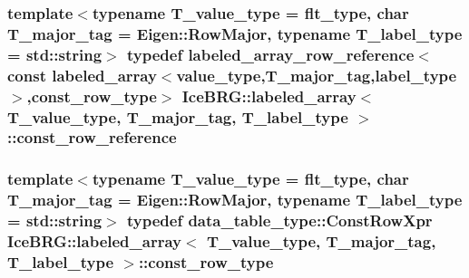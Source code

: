 \subsubsection[{const\+\_\+row\+\_\+reference}]{\setlength{\rightskip}{0pt plus 5cm}template$<$typename T\+\_\+value\+\_\+type = flt\+\_\+type, char T\+\_\+major\+\_\+tag = Eigen\+::\+Row\+Major, typename T\+\_\+label\+\_\+type = std\+::string$>$ typedef {\bf labeled\+\_\+array\+\_\+row\+\_\+reference}$<$const {\bf labeled\+\_\+array}$<${\bf value\+\_\+type},T\+\_\+major\+\_\+tag,{\bf label\+\_\+type}$>$,{\bf const\+\_\+row\+\_\+type}$>$ {\bf Ice\+B\+R\+G\+::labeled\+\_\+array}$<$ T\+\_\+value\+\_\+type, T\+\_\+major\+\_\+tag, T\+\_\+label\+\_\+type $>$\+::{\bf const\+\_\+row\+\_\+reference}}\label{classIceBRG_1_1labeled__array_ac210266c8ef4db02af31dd1a1a2625f5}
\hypertarget{classIceBRG_1_1labeled__array_adc26b87565fcd554a2b1f82adf965084}{}
\subsubsection[{const\+\_\+row\+\_\+type}]{\setlength{\rightskip}{0pt plus 5cm}template$<$typename T\+\_\+value\+\_\+type = flt\+\_\+type, char T\+\_\+major\+\_\+tag = Eigen\+::\+Row\+Major, typename T\+\_\+label\+\_\+type = std\+::string$>$ typedef data\+\_\+table\+\_\+type\+::\+Const\+Row\+Xpr {\bf Ice\+B\+R\+G\+::labeled\+\_\+array}$<$ T\+\_\+value\+\_\+type, T\+\_\+major\+\_\+tag, T\+\_\+label\+\_\+type $>$\+::{\bf const\+\_\+row\+\_\+type}}\label{classIceBRG_1_1labeled__array_adc26b87565fcd554a2b1f82adf965084}
\hypertarget{classIceBRG_1_1labeled__array_a6aec05e454845b2750b446c00fd4c9fb}{}
